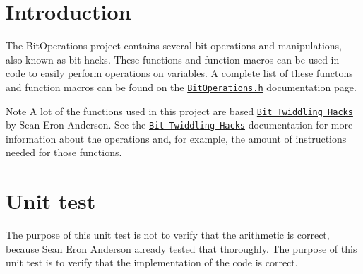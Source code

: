 \hypertarget{index_intro_sec}{}\section{Introduction}\label{index_intro_sec}
The Bit\+Operations project contains several bit operations and manipulations, also known as \textquotesingle{}bit hacks\textquotesingle{}. These functions and function macros can be used in code to easily perform operations on variables. A complete list of these functons and function macros can be found on the \href{BitOperations_8h.html}{\tt Bit\+Operations.\+h} documentation page.

\begin{DoxyNote}{Note}
A lot of the functions used in this project are based \href{https://graphics.stanford.edu/~seander/bithacks.html}{\tt Bit Twiddling Hacks} by Sean Eron Anderson. See the \href{https://github.com/gibsjose/BitHacks/blob/master/BitHacks.md}{\tt Bit Twiddling Hacks} documentation for more information about the operations and, for example, the amount of instructions needed for those functions.
\end{DoxyNote}
\hypertarget{index_unit_test}{}\section{Unit test}\label{index_unit_test}
The purpose of this unit test is not to verify that the arithmetic is correct, because Sean Eron Anderson already tested that thoroughly. The purpose of this unit test is to verify that the implementation of the code is correct. 